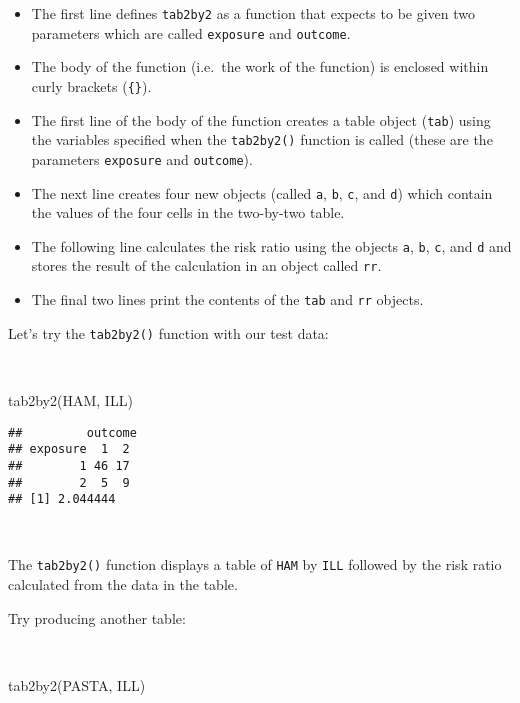 \documentclass[
  12pt,
  a4paper]{book}
\newenvironment{Shaded}{\begin{snugshade}}{\end{snugshade}}
\newcommand{\FunctionTok}[1]{\textcolor[rgb]{0.00,0.00,0.00}{#1}}
\newcommand{\NormalTok}[1]{#1}
\begin{document}
\begin{itemize}
\item
  The first line defines \texttt{tab2by2} as a function that expects to be given two parameters which are called \texttt{exposure} and \texttt{outcome}.
\item
  The body of the function (i.e.~the work of the function) is enclosed within curly brackets (\texttt{\{\}}).
\item
  The first line of the body of the function creates a table object (\texttt{tab}) using the variables specified when the \texttt{tab2by2()} function is called (these are the parameters \texttt{exposure} and \texttt{outcome}).
\item
  The next line creates four new objects (called \texttt{a}, \texttt{b}, \texttt{c}, and \texttt{d}) which contain the values of the four cells in the two-by-two table.
\item
  The following line calculates the risk ratio using the objects \texttt{a}, \texttt{b}, \texttt{c}, and \texttt{d} and stores the result of the calculation in an object called \texttt{rr}.
\item
  The final two lines print the contents of the \texttt{tab} and \texttt{rr} objects.
\end{itemize}

\newpage

Let's try the \texttt{tab2by2()} function with our test data:

~

\begin{Shaded}
\begin{Highlighting}[]
\FunctionTok{tab2by2}\NormalTok{(HAM, ILL)}
\end{Highlighting}
\end{Shaded}

\begin{verbatim}
##         outcome
## exposure  1  2
##        1 46 17
##        2  5  9
## [1] 2.044444
\end{verbatim}

~

The \texttt{tab2by2()} function displays a table of \texttt{HAM} by \texttt{ILL} followed by the risk ratio calculated from the data in the table.

Try producing another table:

~

\begin{Shaded}
\begin{Highlighting}[]
\FunctionTok{tab2by2}\NormalTok{(PASTA, ILL)}
\end{Highlighting}
\end{Shaded}
\end{document}
